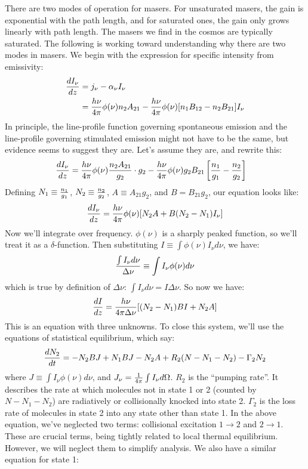 \documentclass[11pt]{article}
\def\inv#1{{1 \over #1}}
\def\ato{{A_{21}}}
\def\bto{{B_{21}}}
\def\bot{{B_{12}}}
\begin{document}
There are two modes of operation for masers.  For unsaturated masers, the gain
is exponential with the path length, and for saturated ones, the gain only
grows linearly with path length.  The masers we find in the cosmos are typically
saturated.  The following is working toward understanding why there are two
modes in masers.  We begin with the expression for specific intensity from
emissivity:
$$\begin{aligned}{dI_\nu\over dz}&=j_\nu-\alpha_\nu I_\nu\\ 
&={h\nu\over4\pi}\phi(\nu)n_2A_{21}-{h\nu\over4\pi}
\phi(\nu)[n_1\bot-n_2\bto]I_\nu\\ \end{aligned}$$
In principle, the line-profile function governing spontaneous emission and the
line-profile governing stimulated emission might not have to be the same, but
evidence seems to suggest they are.  Let's assume they are, and rewrite this:
$$\begin{aligned}{dI_\nu\over dz}&={h\nu\over4\pi}\phi(\nu){n_2\ato\over g_2}\cdot g_2
-{h\nu\over4\pi}\phi(\nu)g_2\bto\left[{n_1\over g_1}-{n_2\over g_2}\right]
\end{aligned}$$
Defining $N_1\equiv{n_1\over g_1}$, $N_2\equiv{n_2\over g_2}$, $A\equiv
\ato g_2$, and $B=\bto g_2$, our equation looks like:
$${dI_\nu\over dz}={h\nu\over4\pi}\phi(\nu)[N_2A+B(N_2-N_1)I_\nu]$$
Now we'll integrate over frequency.  $\phi(\nu)$ is a sharply peaked function,
so we'll treat it as a $\delta$-function.  Then substituting
$I\equiv\int{\phi(\nu)I_\nu d\nu}$, we have:
$${\int{I_\nu d\nu}\over\Delta\nu}\equiv\int{I_\nu\phi(\nu)d\nu}$$
which is true by definition of $\Delta\nu$: $\int{I_\nu d\nu}=I\Delta\nu$.
So now we have:
$${dI\over dz}={h\nu\over4\pi\Delta\nu}[(N_2-N_1)BI+N_2A]$$
This is an equation with three unknowns.  To close this system, we'll use the
equations of statistical equilibrium, which say:
$${dN_2\over dt}=-N_2BJ+N_1BJ-N_2A+R_2(N-N_1-N_2)-\Gamma_2N_2$$
where $J\equiv\int{I_\nu\phi(\nu)d\nu}$, and $J_\nu=\inv{4\pi}\int{I_\nu
d\Omega}$.  $R_2$ is the ``pumping rate''.  It describes the rate at which
molecules not in state 1 or 2 (counted by $N-N_1-N_2$) are radiatively or 
collisionally
knocked into state 2. $\Gamma_2$ is the loss rate of molecules in state 2 into
any state other than state 1.  In the above equation, we've neglected two
terms: collisional excitation $1\to2$ and $2\to1$.  These are crucial terms,
being tightly related to local thermal equilibrium.  However, we will neglect
them to simplify analysis.  We also have a similar equation for state 1:
\end{document}
